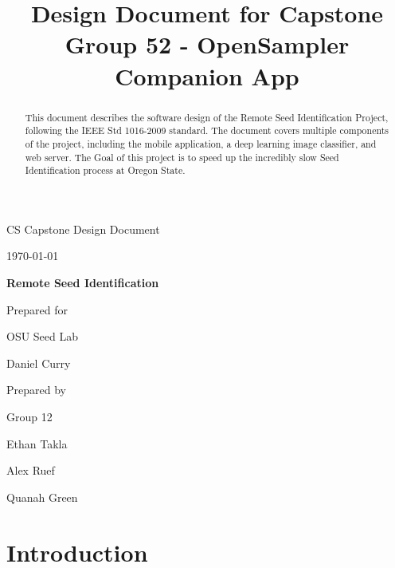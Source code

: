 \documentclass[onecolumn, draftclsnofoot,10pt, compsoc]{IEEEtran}
\title{Design Document for Capstone Group 52 - OpenSampler Companion App}
\def \CapstoneTeamNumber{      12}
\def \GroupMemberOne{          Ethan Takla}
\def \GroupMemberTwo{          Alex Ruef}
\def \GroupMemberThree{        Quanah Green}
\def \CapstoneProjectName{     Remote Seed Identification}
\def \CapstoneSponsorCompany{  OSU Seed Lab}
\def \CapstoneSponsorPersonOne{Daniel Curry}
\def\DocType{%
             Design Document
             }
\newcommand{\NameSigPair}[1]{\par
               \makebox[2.75in][r]{#1} \hfil
               \makebox[3.25in]{\makebox[2.25in]{\hrulefill} \hfill
                 \makebox[.75in]{\hrulefill}}
               \par\vspace{-12pt} \textit{\tiny\noindent
                 \makebox[2.75in]{} \hfil
                 \makebox[3.25in]{\makebox[2.25in][r]{Signature}
                   \hfill \makebox[.75in][r]{Date}}}}
\renewcommand{\NameSigPair}[1]{#1}
\begin{document}
\begin{titlepage}
    \begin{singlespace}
        \hfill
        \par\vspace{.2in}
        \centering
        \scshape{\huge CS Capstone \DocType \par
            {\large\today}\par
            \vspace{.5in}
            \textbf{\Huge\CapstoneProjectName}\par
            \vfill
            {\large Prepared for}\par
            \Huge \CapstoneSponsorCompany\par
            \vspace{5pt}
            {\Large
                \NameSigPair{\CapstoneSponsorPersonOne}\par
            }
            {\large Prepared by }\par
            Group\CapstoneTeamNumber\par
            \vspace{5pt}
            {\Large
                \NameSigPair{\GroupMemberOne}\par
                \NameSigPair{\GroupMemberTwo}\par
                \NameSigPair{\GroupMemberThree}\par
            }
            \vspace{20pt}
        }
        \begin{abstract}
        	This document describes the software design of the Remote Seed Identification Project, following the IEEE Std 1016-2009 standard.
            The document covers multiple components of the project, including the mobile application, a deep learning image classifier, and web server. The Goal of this project is to speed up the incredibly slow Seed Identification process at Oregon State.
            
        \end{abstract}
    \end{singlespace}
\end{titlepage}
\newpage
{}
\tableofcontents
\clearpage

\section{Introduction}
\end{document}
